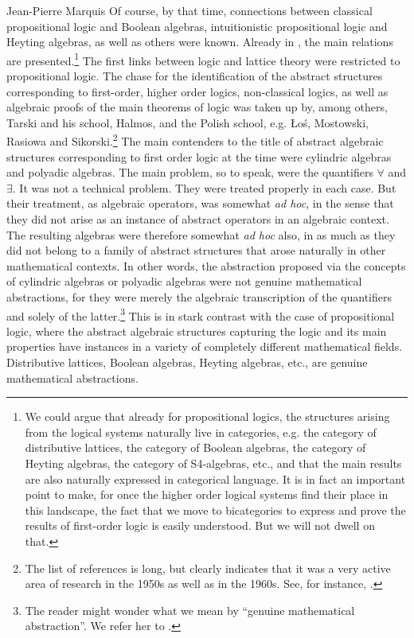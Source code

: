 \begin{artengenv}{Jean-Pierre Marquis}
Of course, by that time, connections between classical propositional logic and Boolean algebras, intuitionistic propositional logic and Heyting algebras, as well as others were known. Already in \parencite{Birkhoff1940}, the main relations are presented.\footnote{We could argue  that already for propositional logics, the structures arising from the logical systems naturally live in categories, e.g. the category of distributive lattices, the category of Boolean algebras, the category of Heyting algebras, the category of S4-algebras, etc., and that the main results are also naturally expressed in categorical language. It is in fact an important point to make, for once the higher order logical systems find their place in this landscape, the fact that we move to bicategories to express and prove the results of first-order logic is easily understood. But we will not dwell on that.}  The first links between logic and lattice theory were restricted to propositional logic. The chase for the identification of the abstract structures corresponding to first-order, higher order logics, non-classical logics, as well as algebraic proofs of the main theorems of logic was taken up by, among others, Tarski and his school, Halmos, and the Polish school, e.g. \L o\'{s}, Mostowski, Rasiowa and Sikorski.\footnote{The list of references is long, but clearly indicates that it was a very active area of research in the 1950s as well as in the 1960s. See, for instance,
 \parencite{McKinseyTarski1944,McKinseyTarski1946,McKinseyTarski1948,JonssonTarski1951,JonssonTarski1952,HenkinTarski1961,HenkinTarski1971,Halmos1954,Halmos1956,Halmos1956a,Halmos1956b,Halmos1956c,Halmos1962,Mostowski1949,Rasiowa1951,Rasiowa1955,RasiowaSik1950,RasiowaSik1953,RasiowaSik1955,RasiowaSik1963}.} 
The main contenders to the title of abstract algebraic structures corresponding to first order logic at the time were cylindric algebras and polyadic algebras. The main problem, so to speak, were the quantifiers $\forall$ and $\exists$. It was not a technical problem. They were treated properly in each case. But their treatment, as algebraic operators, was somewhat \emph{ad hoc}, in the sense that they did not arise as an instance of abstract operators in an algebraic context. The resulting algebras were therefore somewhat \emph{ad hoc} also, in as much as they did not belong to a family of abstract structures that arose naturally in other mathematical contexts. In other words, the abstraction proposed via the concepts of cylindric algebras or polyadic algebras were not genuine mathematical abstractions, for they were merely the algebraic transcription of the quantifiers and solely of the latter.\footnote{The reader might wonder what we mean by ``genuine mathematical abstraction''. We refer her to \parencite{Marquis2014,Marquis2016}.} This is in stark contrast with the case of propositional logic, where the abstract algebraic structures capturing the logic and its main properties have instances in a variety of completely different mathematical fields. Distributive lattices, Boolean algebras, Heyting algebras, etc., are genuine mathematical abstractions.


\end{artengenv}
